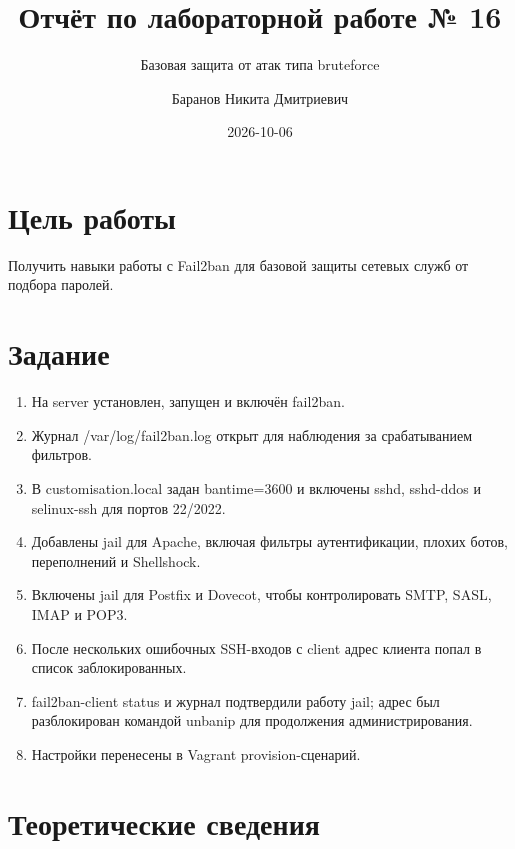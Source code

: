 \documentclass[
  english,
  russian,
  12pt,
  a4paper,
  DIV=11,
  numbers=noendperiod]{scrreprt}
\title{Отчёт по лабораторной работе № 16}
\subtitle{Базовая защита от атак типа bruteforce}
\author{Баранов Никита Дмитриевич}
\date{2026-10-06}
\providecommand{\tightlist}{%
  \setlength{\itemsep}{0pt}\setlength{\parskip}{0pt}}
\renewcommand*\contentsname{Содержание}
\newcommand\contentsname{Содержание}
\begin{document}
\maketitle

\renewcommand*\contentsname{Содержание}
{
\setcounter{tocdepth}{1}
\tableofcontents
}
\listoffigures
\listoftables

\chapter{Цель
работы}\label{ux446ux435ux43bux44c-ux440ux430ux431ux43eux442ux44b}

Получить навыки работы с Fail2ban для базовой защиты сетевых служб от
подбора паролей.

\chapter{Задание}\label{ux437ux430ux434ux430ux43dux438ux435}

\begin{enumerate}
\def\labelenumi{\arabic{enumi}.}
\tightlist
\item
  На server установлен, запущен и включён fail2ban.
\item
  Журнал /var/log/fail2ban.log открыт для наблюдения за срабатыванием
  фильтров.
\item
  В customisation.local задан bantime=3600 и включены sshd, sshd-ddos и
  selinux-ssh для портов 22/2022.
\item
  Добавлены jail для Apache, включая фильтры аутентификации, плохих
  ботов, переполнений и Shellshock.
\item
  Включены jail для Postfix и Dovecot, чтобы контролировать SMTP, SASL,
  IMAP и POP3.
\item
  После нескольких ошибочных SSH-входов с client адрес клиента попал в
  список заблокированных.
\item
  fail2ban-client status и журнал подтвердили работу jail; адрес был
  разблокирован командой unbanip для продолжения администрирования.
\item
  Настройки перенесены в Vagrant provision-сценарий.
\end{enumerate}

\chapter{Теоретические
сведения}\label{ux442ux435ux43eux440ux435ux442ux438ux447ux435ux441ux43aux438ux435-ux441ux432ux435ux434ux435ux43dux438ux44f}
\end{document}
